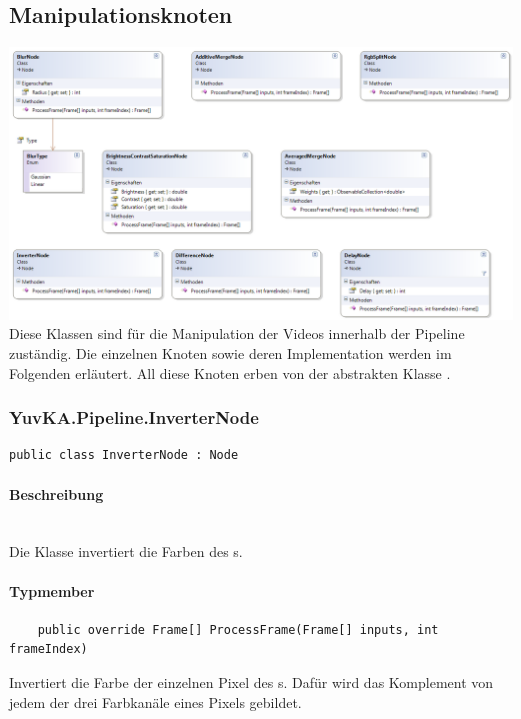 \subsection{Manipulationsknoten}

\includegraphics[width=\textwidth]{YuvKA.Pipeline/manipulationnodes.png}
Diese Klassen sind für die Manipulation der Videos innerhalb der Pipeline zuständig. Die einzelnen Knoten sowie deren Implementation werden im Folgenden erläutert. All diese Knoten erben von der abstrakten Klasse .

\subsubsection{YuvKA.Pipeline.InverterNode}
\begin{verbatim}
public class InverterNode : Node
\end{verbatim}

\paragraph{Beschreibung}~\\
Die Klasse  invertiert die Farben des s.

\paragraph{Typmember}
\begin{itemize}

	\begin{verbatim}
	public override Frame[] ProcessFrame(Frame[] inputs, int frameIndex)
	\end{verbatim}
	Invertiert die Farbe der einzelnen Pixel des s. Dafür wird das Komplement von jedem der drei Farbkanäle eines Pixels gebildet.

\end{itemize}


